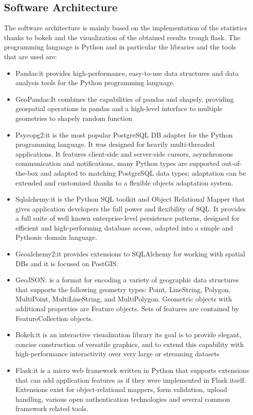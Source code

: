 \documentclass{article}
\begin{document}
\subsection{Software Architecture}
The software architecture is mainly based on the implementation of the statistics thanks to bokeh and the visualization of the obtained results trough flask.
The programming language is Python and in particular the libraries and the tools that are used are:
\begin{itemize}
    \item Pandas:it provides high-performance, easy-to-use data structures and data analysis tools for the Python programming language. 
    \item GeoPandas:It combines the capabilities of pandas and shapely, providing geospatial operations in pandas and a high-level interface to multiple geometries to shapely random function
    \item Psycopg2:it is the most popular PostgreSQL DB adapter for the Python programming language. It was designed for heavily multi-threaded applications. It features client-side and server-side cursors, asynchronous communication and notifications, many Python types are supported out-of-the-box and adapted to matching  PostgreSQL data types; adaptation can be extended and customized thanks to a flexible objects adaptation system.
    \item Sqlalchemy:it is the Python SQL toolkit and Object Relational Mapper that gives application developers the full power and flexibility of SQL. It provides a full suite of well known enterprise-level persistence patterns, designed for efficient and high-performing database access, adapted into a simple and Pythonic domain language.
    \item Geoalchemy2:it provides extensions to SQLAlchemy for working with spatial DBs and it is focused on PostGIS.
    \item GeoJSON: is a format for encoding a variety of geographic data structures that supports the following geometry types: Point, LineString, Polygon, MultiPoint, MultiLineString, and MultiPolygon. Geometric objects with additional properties are Feature objects. Sets of features are contained by FeatureCollection objects.
    \item Bokeh:it is an interactive visualization library its goal is to provide elegant, concise construction of versatile graphics, and to extend this capability with high-performance interactivity over very large or streaming datasets
    \item Flask:it is a micro web framework written in Python that supports extensions that can add application features as if they were implemented in Flask itself. Extensions exist for object-relational mappers, form validation, upload handling, various open authentication technologies and several common framework related tools. 

\end{itemize}
\end{document}
